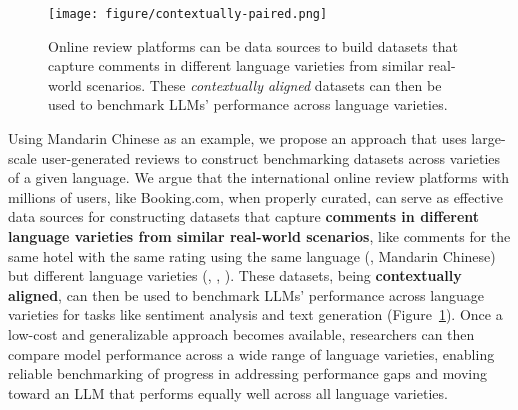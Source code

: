 \begin{figure}[t]
    \centering
    \texttt{[image: figure/contextually-paired.png]}
    \vspace{-.5pc}
    \caption{Online review platforms can be data sources to build datasets that capture comments in different language varieties from similar real-world scenarios. These \textit{contextually aligned} datasets can then be used to benchmark LLMs' performance across language varieties.}
    \vspace{-1.5pc}
    \label{fig:overview}
\end{figure}


Using Mandarin Chinese as an example, we propose an approach that uses large-scale user-generated reviews to construct benchmarking datasets across varieties of a given language. 
We argue that the international online review platforms with millions of users, like Booking.com, when properly curated, can serve as effective data sources for constructing datasets that capture \textbf{comments in different language varieties from similar real-world scenarios}, like comments for the same hotel with the same rating using the same language (\eg, Mandarin Chinese) but different language varieties (\eg, \twChinese, \cnChinese). 
These datasets, being \textbf{contextually aligned}, can then be used to benchmark LLMs' performance across language varieties for tasks like sentiment analysis and text generation (Figure~\ref{fig:overview}). 
Once a low-cost and generalizable approach becomes available, researchers can then compare model performance across a wide range of language varieties, enabling reliable benchmarking of progress in addressing performance gaps and moving toward an LLM that performs equally well across all language varieties. 






